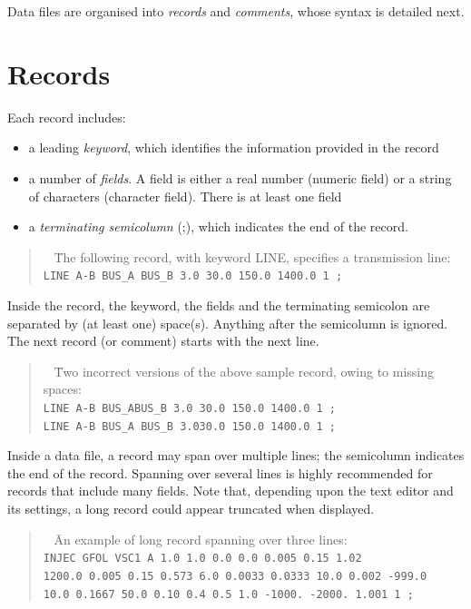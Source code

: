Data files are organised into {\em records} and {\em comments}, whose syntax is detailed next.

\section{Records}

Each record includes:
\begin{itemize}
\item a leading {\em keyword}, which identifies the information provided in the record
\item a number of {\em fields}. A field is either a real number (numeric field) or a string of characters (character field). There is at least one field
\item a {\em terminating semicolumn} (;), which indicates the end of the record.
\end{itemize}

\begin{quote}
\begin{tabbing}
\faHandPointRight ~ \= \rm The following record, with keyword LINE, specifies a transmission line:\\
\> \tt LINE A-B BUS\_A BUS\_B  3.0 30.0 150.0 1400.0 1 ;
\end{tabbing}
\end{quote} 

Inside the record, the keyword, the fields and the terminating semicolon are separated by (at least one) space(s). Anything after the semicolumn is ignored. The next record (or comment) starts with the next line.

\begin{quote}
\begin{tabbing}
\faHandPointRight ~ \= \rm Two incorrect versions of the above sample record, owing to missing spaces:\\
\> \tt LINE A-B BUS\_ABUS\_B  3.0 30.0 150.0 1400.0 1 ;\\
\> \tt LINE A-B BUS\_A BUS\_B  3.030.0 150.0 1400.0 1 ;
\end{tabbing}
\end{quote} 

Inside a data file, a record may span over multiple lines; the semicolumn indicates the end of the record. Spanning over several lines is highly recommended for records that include many fields. Note that, depending upon the text editor and its settings, a long record could appear truncated when displayed.  

\begin{quote}
\begin{tabbing}
\faHandPointRight ~ \= \rm An example of long record spanning over three lines: \\
\> \tt INJEC GFOL VSC1 A 1.0 1.0 0.0 0.0 0.005 0.15 1.02 \\
\> \tt  1200.0 0.005 0.15 0.573 6.0 0.0033 0.0333 10.0 0.002 -999.0 \\
\> \tt  10.0 0.1667 50.0 0.10 0.4 0.5 1.0 -1000. -2000. 1.001 1 ;\\
\end{tabbing}
\end{quote} 

